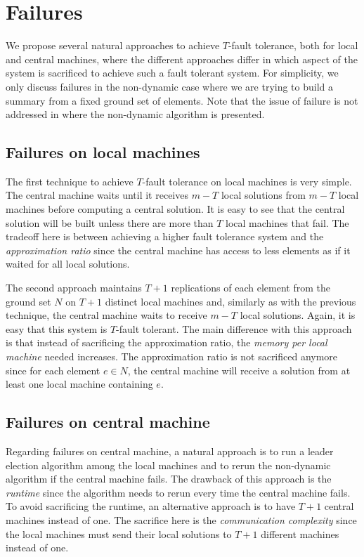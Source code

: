 \section{Failures}
\label{s:failures}
We propose several natural approaches to achieve $T$-fault tolerance, both for local and central machines, where the different approaches differ in which aspect of the system is sacrificed to achieve such a fault tolerant system. For simplicity, we only discuss failures in the non-dynamic case where we are trying to build a summary from a fixed ground set of elements. Note that the issue of failure is not addressed in \cite{mirzasoleiman2013distributed} where the non-dynamic algorithm is presented.

\subsection{Failures on local machines}

The first technique to achieve $T$-fault tolerance on local machines is very simple. The central machine waits until it receives $m -T$ local solutions from $m-T$ local machines before computing a central solution. It is easy to see that the central solution will be built unless there are more than $T$ local machines that fail. The tradeoff here is between achieving a higher fault tolerance system and the \textit{approximation ratio} since the central machine has access to less elements as if it waited for all local solutions.

The second approach maintains $T+1$ replications of each element from the ground set $N$ on $T+1$ distinct local machines and, similarly as with the previous technique, the central machine waits to receive $m-T$ local solutions. Again, it is easy that this system is $T$-fault tolerant. The main difference with this approach is that instead of sacrificing the approximation ratio, the \textit{memory per local machine} 
needed increases. The approximation ratio is not sacrificed anymore since for each element $e \in N$, the central machine will receive a solution from at least one local machine containing $e$.

\subsection{Failures on central machine}

Regarding failures on central machine, a natural approach is to run a leader election algorithm among the local machines and to rerun the non-dynamic algorithm if the central machine fails. The drawback of this approach is the \textit{runtime} since the algorithm needs to rerun every time the central machine fails. To avoid sacrificing the runtime, an alternative approach is to have $T+1$ central machines instead of one. The sacrifice here is the \textit{communication complexity} since the local machines must send their local solutions to $T+1$ different machines instead of one.

